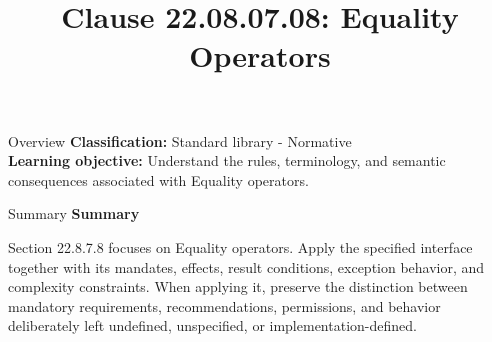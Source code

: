 \documentclass[10pt,letterpaper]{article}
\title{Clause 22.08.07.08: Equality Operators}
\author{}
\date{}
\begin{document}
\maketitle
\begin{CornellOverviewBox}{Overview}
\textbf{Classification:} Standard library - Normative\\[2pt]
\textbf{Learning objective:} Understand the rules, terminology, and semantic consequences associated with Equality operators.
\end{CornellOverviewBox}\begin{CornellSummaryBox}{Summary}
{\sffamily\bfseries\color{Accent} Summary}\par\vspace{3pt}Section 22.8.7.8 focuses on Equality operators. Apply the specified interface together with its mandates, effects, result conditions, exception behavior, and complexity constraints. When applying it, preserve the distinction between mandatory requirements, recommendations, permissions, and behavior deliberately left undefined, unspecified, or implementation-defined.
\end{CornellSummaryBox}
\end{document}
